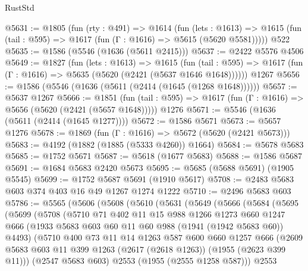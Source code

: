 \begin{lexlean}{RustStd}
\begin{coremodule}
@5631 := @1805
    (fun (rty : @491) =>
    @1614
      (fun (lets : @1613) =>
      @1615 (fun (tail : @595) => @1617 (fun (Γ : @1616) => @5615 (@5620 @5581)))))
    @522
@5635 := @1586 (@5546 (@1636 (@5611 @2415)))
@5637 := @2422 @5576 @4506
@5649 := @1827
    (fun (lets : @1613) =>
    @1615
      (fun (tail : @595) => @1617 (fun (Γ : @1616) => @5635 (@5620 (@2421 (@5637 @1646 @1648))))))
    @1267
@5656 := @1586 (@5546 (@1636 (@5611 (@2414 (@1645 (@1268 @1648))))))
@5657 := @5637 @1267
@5666 := @1851
    (fun (tail : @595) => @1617 (fun (Γ : @1616) => @5656 (@5620 (@2421 (@5657 @1648)))))
    @1276
@5671 := @5546 (@1636 (@5611 (@2414 (@1645 @1277))))
@5672 := @1586 @5671
@5673 := @5657 @1276
@5678 := @1869 (fun (Γ : @1616) => @5672 (@5620 (@2421 @5673)))
@5683 := @4192 (@1882 (@1885 (@5333 @4260)) @1664)
@5684 := @5678 @5683
@5685 := @1752 @5671
@5687 := @5618 (@1677 @5683)
@5688 := @1586 @5687
@5691 := @1684 @5683 @2420 @5673
@5695 := @5685 (@5688 @5691) (@1905 @5545)
@5699 := @1752 @5687 @5691 (@1910 @5617)
@5708 := @2483 @5683 @603 @374 @403 @16 @49 @1267 @1274 @1222
@5710 := @2496 @5683 @603
@5786 := @5565
    (@5606
      (@5608
        (@5610
          (@5631
            (@5649
              (@5666
                (@5684
                  (@5695
                    (@5699
                      (@5708
                        (@5710
                          @71
                          @402
                          @11
                          @15
                          @988
                          @1266
                          @1273
                          @660
                          @1247
                          @666
                          (@1933 @5683 @603 @60 @11 @60 @988 (@1941 (@1942 @5683 @60)) @4493)
                          (@5710
                            @400
                            @73
                            @11
                            @14
                            @1263
                            @587
                            @600
                            @660
                            @1257
                            @666
                            (@2609
                              @5683
                              @603
                              @11
                              @399
                              @1263
                              (@2617 (@2618 @1263))
                              (@1955 (@2623 @399 @11)))
                            (@2547 @5683 @603)
                            @2553
                            (@1955 (@2555 @1258 @587)))
                          @2553

\end{coremodule}
\end{lexlean}
